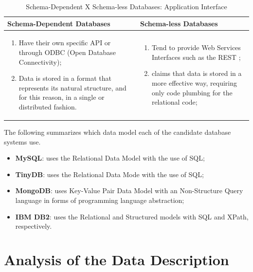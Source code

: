 \begin{table}
    \label{tab:tab:schema-vs-schemaless-api-interface}
    \caption{Schema-Dependent X Schema-less Databases: Application Interface}
    \begin{center}
    \begin{tabular}{|p{210pt}|p{210pt}|}\hline
    Schema-Dependent Databases & Schema-less Databases\\\hline
    \begin{enumerate}
      \item Have their own specific API or through ODBC (Open Database
      Connectivity);
      \item Data is stored in a format that represents its natural structure,
      and for this reason, in a single or distributed fashion.
    \end{enumerate} 
    & 
    \begin{enumerate}
      \item Tend to provide Web Services Interfaces such as the REST
      \cite{http-rest};
      \item \cite{db-is-rdbs-dommed} claims that data is stored in a more
      effective way, requiring only code plumbing for the relational code;
    \end{enumerate}
    \\\hline
    \end{tabular}
    \end{center}
\end{table}

The following summarizes which data model each of the candidate database
systems use.

\begin{itemize}
  \item \textbf{MySQL}: uses the Relational Data Model with the use of SQL;
  \item \textbf{TinyDB}: uses the Relational Data Mode with the use of SQL; 
  \item \textbf{MongoDB}: uses Key-Value Pair Data Model with an Non-Structure
  Query language in forms of programming language abstraction;
  \item \textbf{IBM DB2}: uses the Relational and Structured models with SQL
  and XPath, respectively.
\end{itemize}

\section{Analysis of the Data Description}

